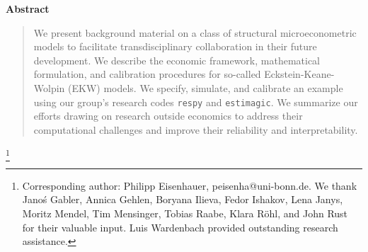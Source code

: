 
\maketitle


\vspace{0.5cm}
\renewcommand{\baselinestretch}{1.3}\normalsize

\setcounter{page}{1}
\thispagestyle{empty}

\begin{center}\textbf{Abstract}\end{center}
\begin{abstract}
\noindent We present background material on a class of structural microeconometric models to facilitate transdisciplinary collaboration in their future development. We describe the economic framework, mathematical formulation, and calibration procedures for so-called Eckstein-Keane-Wolpin (EKW) models. We specify, simulate, and calibrate an example using our group's research codes \verb+respy+ and \verb+estimagic+. We summarize our efforts drawing on research outside economics to address their computational challenges and improve their reliability and interpretability.
\end{abstract}

{\let\thefootnote\relax\footnote{Corresponding author: Philipp Eisenhauer, peisenha@uni-bonn.de. We thank  Jano\'s Gabler, Annica Gehlen, Boryana Ilieva, Fedor Ishakov, Lena Janys, Moritz Mendel, Tim Mensinger, Tobias Raabe, Klara R\"ohl, and John Rust for their valuable input. Luis Wardenbach provided outstanding research assistance.}}

\setcounter{page}{1}
\setcounter{footnote}{0} 
\thispagestyle{empty}

\newpage
\tableofcontents
\newpage
